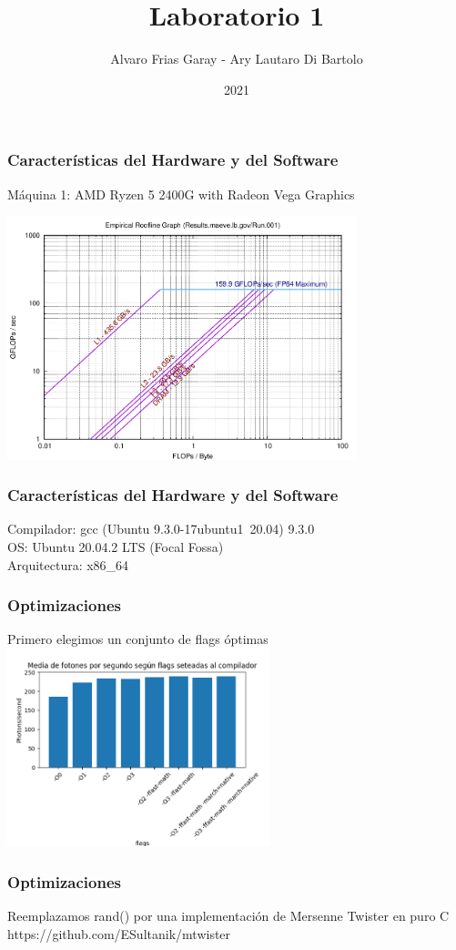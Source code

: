 \documentclass{beamer}
\title{Laboratorio 1}
\author{Alvaro Frias Garay - Ary Lautaro Di Bartolo}
\institute{Universidad Nacional de Córdoba - Universidad Nacional de Cuyo}
\date{2021}
\begin{document}
\frame{\titlepage}


\begin{frame}
    \frametitle{Características del Hardware y del Software}
    Máquina 1: AMD Ryzen 5 2400G with Radeon Vega Graphics

    \includegraphics[width=4in]{./imagenes/RTK_ALVARO.png}


\end{frame}

\begin{frame}
    \frametitle{Características del Hardware y del Software}
    Compilador: gcc (Ubuntu 9.3.0-17ubuntu1~20.04) 9.3.0 \\
    OS: Ubuntu 20.04.2 LTS (Focal Fossa) \\
    Arquitectura: x86\_64
\end{frame}


\begin{frame}
    \frametitle{Optimizaciones}

    Primero elegimos un conjunto de flags óptimas \pause
    \includegraphics[width=3in]{./imagenes/comparacion_flags_sin_optimizar.png}

\end{frame}

\begin{frame}
    \frametitle{Optimizaciones}
        Reemplazamos rand() por una implementación de Mersenne Twister en puro C\\\pause
        https://github.com/ESultanik/mtwister
\end{frame}
\end{document}
